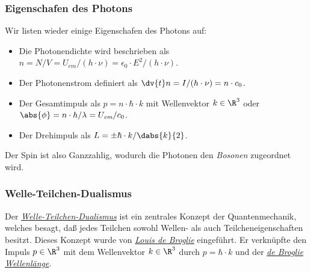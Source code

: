 \documentclass{article}
\begin{document}
        \subsubsection*{Eigenschafen des Photons}
            Wir listen wieder einige Eigenschafen des Photons auf:
            \begin{itemize}
                \item Die Photonendichte wird beschrieben als $n = N/V = U_\textit{em} / (h\cdot\nu) = \epsilon_0\cdot E^2 / (h\cdot\nu)$.
                \item Der Photonenstrom definiert als $\dv{t} n = I/(h\cdot\nu) = n\cdot c_0$.
                \item Der Gesamtimpuls als $p = n\cdot\hbar\cdot k$ mit Wellenvektor $k\in\R^3$ oder $\abs{\phi} = n\cdot h/\lambda = U_\textit{em} / c_0$. 
                \item Der Drehimpuls als $L = \pm \hbar\cdot k / \dabs{k}{2}$. 
            \end{itemize}
            Der Spin ist also Ganzzahlig, wodurch die Photonen den \emph{Bosonen} zugeordnet wird. 

        \subsubsection*{Welle-Teilchen-Dualismus}
            Der \href{https://de.wikipedia.org/wiki/Welle-Teilchen-Dualismus}{\emph{Welle-Teilchen-Dualismus}} ist ein zentrales Konzept der Quantenmechanik, welches besagt, daß jedes Teilchen sowohl Wellen- als auch Teilcheneigenschaften besitzt. Dieses Konzept wurde von \href{https://de.wikipedia.org/wiki/Louis_de_Broglie}{\emph{Louis de Broglie}} eingeführt. Er verknüpfte den Impuls $p\in\R^3$ mit dem Wellenvektor $k\in\R^3$ durch $p = \hbar\cdot k$ und der \href{https://de.wikipedia.org/wiki/Materiewelle}{\emph{de Broglie Wellenlänge}}. 
\end{document}
